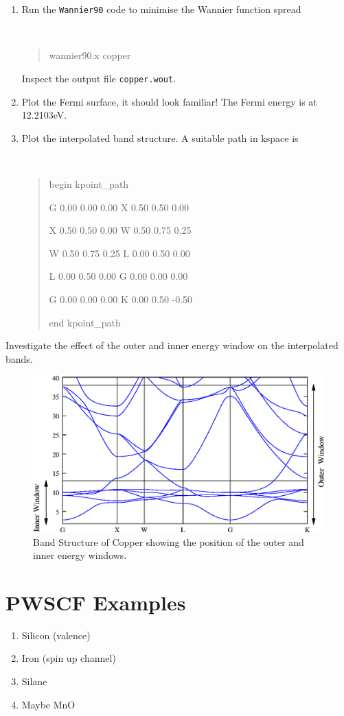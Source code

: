 \documentclass[a4paper,11pt,twoside]{article}
\begin{document}
\begin{enumerate}
\item Run the {\tt Wannier90} code to minimise the Wannier function spread
{\tt
\begin{quote}
wannier90.x copper
\end{quote} }
Inspect the output file {\tt copper.wout}. 

\item Plot the Fermi surface, it should look familiar! The Fermi energy is at 12.2103eV.

\item Plot the interpolated band structure. A suitable path in kspace is
\smallskip
{\tt
\begin{quote}
begin kpoint\_path

G 0.00  0.00  0.00    X 0.50  0.50  0.00

X 0.50  0.50  0.00    W 0.50  0.75  0.25

W 0.50  0.75  0.25    L 0.00  0.50  0.00

L 0.00  0.50  0.00    G 0.00  0.00  0.00

G 0.00  0.00  0.00    K 0.00  0.50 -0.50
 
end kpoint\_path
\end{quote} }
\end{enumerate}
Investigate the effect of the outer and inner energy window on the interpolated bands.



\begin{figure}[h]
\begin{center}
\includegraphics{cu.eps}
\caption{Band Structure of Copper showing the position of the outer and inner energy windows.}
\label{fig:pb-bnd}
\end{center}
\end{figure}

\cleardoublepage

\section*{PWSCF Examples}

\begin{enumerate}

\item Silicon (valence)

\item Iron (spin up channel)

\item Silane

\item Maybe MnO

\end{enumerate}
\end{document}
